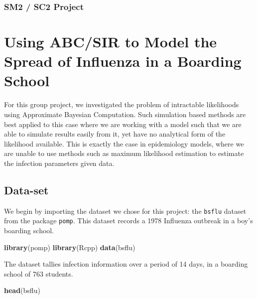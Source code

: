 \documentclass[
]{article}
\author{}
\date{\vspace{-2.5em}}
\newenvironment{Shaded}{\begin{snugshade}}{\end{snugshade}}
\newcommand{\FunctionTok}[1]{\textcolor[rgb]{0.13,0.29,0.53}{\textbf{#1}}}
\newcommand{\NormalTok}[1]{#1}
\begin{document}
\hypertarget{sm2-sc2-project}{%
\subsubsection{SM2 / SC2 Project}\label{sm2-sc2-project}}

\hypertarget{using-abcsir-to-model-the-spread-of-influenza-in-a-boarding-school}{%
\section{Using ABC/SIR to Model the Spread of Influenza in a Boarding
School}\label{using-abcsir-to-model-the-spread-of-influenza-in-a-boarding-school}}

For this group project, we investigated the problem of intractable
likelihoods using Approximate Bayesian Computation. Such simulation
based methods are best applied to this case where we are working with a
model such that we are able to simulate results easily from it, yet have
no analytical form of the likelihood available. This is exactly the case
in epidemiology models, where we are unable to use methods such as
maximum likelihood estimation to estimate the infection parameters given
data.

\hypertarget{data-set}{%
\subsection{Data-set}\label{data-set}}

We begin by importing the dataset we chose for this project: the
\texttt{bsflu} dataset from the package \texttt{pomp}. This dataset
records a 1978 Influenza outbreak in a boy's boarding school.

\begin{Shaded}
\begin{Highlighting}[]
\FunctionTok{library}\NormalTok{(pomp)}
\FunctionTok{library}\NormalTok{(Rcpp)}
\FunctionTok{data}\NormalTok{(bsflu)}
\end{Highlighting}
\end{Shaded}

The dataset tallies infection information over a period of 14 days, in a
boarding school of 763 students.

\begin{Shaded}
\begin{Highlighting}[]
\FunctionTok{head}\NormalTok{(bsflu)}
\end{Highlighting}
\end{Shaded}
\end{document}
